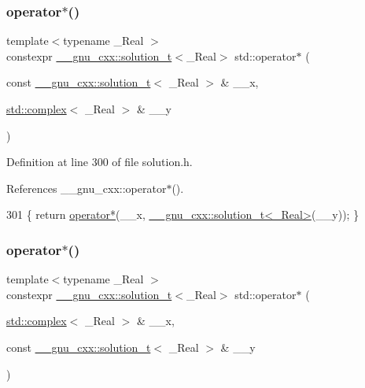 \subsubsection{\texorpdfstring{operator$\ast$()}{operator*()}\hspace{0.1cm}{\footnotesize\ttfamily [4/5]}}
{\footnotesize\ttfamily template$<$typename \+\_\+\+Real $>$ \\
constexpr \hyperlink{namespace____gnu__cxx_ae20ea642de50eb361074c62676b0159c}{\+\_\+\+\_\+gnu\+\_\+cxx\+::solution\+\_\+t}$<$\+\_\+\+Real$>$ std\+::operator$\ast$ (\begin{DoxyParamCaption}\item[{const \hyperlink{namespace____gnu__cxx_ae20ea642de50eb361074c62676b0159c}{\+\_\+\+\_\+gnu\+\_\+cxx\+::solution\+\_\+t}$<$ \+\_\+\+Real $>$ \&}]{\+\_\+\+\_\+x,  }\item[{\hyperlink{classstd_1_1complex}{std\+::complex}$<$ \+\_\+\+Real $>$ \&}]{\+\_\+\+\_\+y }\end{DoxyParamCaption})}



Definition at line 300 of file solution.\+h.



References \+\_\+\+\_\+gnu\+\_\+cxx\+::operator$\ast$().


\begin{DoxyCode}
301     \{ \textcolor{keywordflow}{return} \hyperlink{namespacestd_ae82d1f9ca11a46b93a33f2f89ce71305}{operator*}(\_\_x, \hyperlink{namespace____gnu__cxx_ae20ea642de50eb361074c62676b0159c}{\_\_gnu\_cxx::solution\_t<\_Real>}(\_\_y)); \}
\end{DoxyCode}
\mbox{\label{namespacestd_ae82d1f9ca11a46b93a33f2f89ce71305}} 
\subsubsection{\texorpdfstring{operator$\ast$()}{operator*()}\hspace{0.1cm}{\footnotesize\ttfamily [5/5]}}
{\footnotesize\ttfamily template$<$typename \+\_\+\+Real $>$ \\
constexpr \hyperlink{namespace____gnu__cxx_ae20ea642de50eb361074c62676b0159c}{\+\_\+\+\_\+gnu\+\_\+cxx\+::solution\+\_\+t}$<$\+\_\+\+Real$>$ std\+::operator$\ast$ (\begin{DoxyParamCaption}\item[{\hyperlink{classstd_1_1complex}{std\+::complex}$<$ \+\_\+\+Real $>$ \&}]{\+\_\+\+\_\+x,  }\item[{const \hyperlink{namespace____gnu__cxx_ae20ea642de50eb361074c62676b0159c}{\+\_\+\+\_\+gnu\+\_\+cxx\+::solution\+\_\+t}$<$ \+\_\+\+Real $>$ \&}]{\+\_\+\+\_\+y }\end{DoxyParamCaption})}



